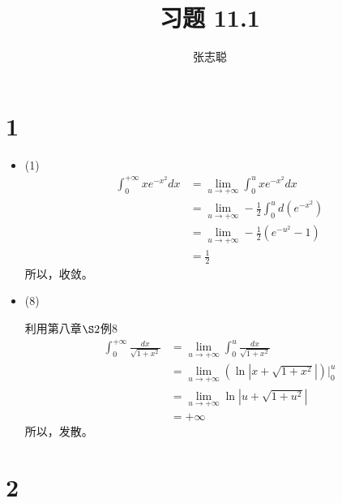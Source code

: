 \documentclass{article}
\begin{document}
\title{习题 11.1}
\author{张志聪}
\maketitle

\section*{1}

\begin{itemize}
  \item (1)
        \begin{align*}
          \int_{0}^{+\infty} x e^{-x^2} dx
           & = \lim\limits_{u \to +\infty} \int_{0}^{u} x e^{-x^2} dx            \\
           & = \lim\limits_{u \to +\infty} - \frac{1}{2}\int_{0}^{u} d(e^{-x^2}) \\
           & = \lim\limits_{u \to +\infty} - \frac{1}{2} (e^{-u^2} - 1)          \\
           & = \frac{1}{2}
        \end{align*}
        所以，收敛。
  \item (8)

        利用第八章$\S 2$例8
        \begin{align*}
          \int_{0}^{+\infty} \frac{dx}{\sqrt{1 + x^2}}
           & = \lim\limits_{u \to +\infty} \int_{0}^{u} \frac{dx}{\sqrt{1 + x^2}}   \\
           & = \lim\limits_{u \to +\infty} (\ln |x + \sqrt{1 + x^2}|)\bigg|_{0}^{u} \\
           & = \lim\limits_{u \to +\infty} \ln |u + \sqrt{1 + u^2}|                 \\
           & = + \infty
        \end{align*}
        所以，发散。
\end{itemize}

\section*{2}
\end{document}
